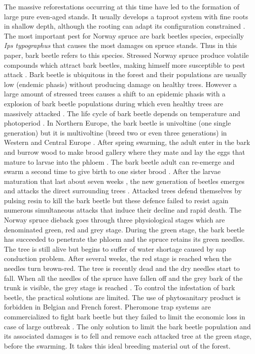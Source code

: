 \documentclass[3p,procedia]{elsarticle}
\begin{document}
The massive reforestations occurring at this time have led to the formation of large pure even-aged stands.
It usually develops a taproot system with fine roots in shallow depth, although the rooting can adapt its configuration constrained \citep{puhe_roots_2003,kostler_1968}.    
The most important pest for Norway spruce are bark beetles species, especially \textit{Ips typographus} that causes the most damages on spruce stands.
Thus in this paper, bark beetle refers to this species.
Stressed Norway spruce produce volatile compounds which attract bark beetles, making himself more susceptible to pest attack \citep{netherer_waterlimiting_2015,netherer_interactions_2021}.
Bark beetle is ubiquitous in the forest and their populations are usually low (endemic phasis) without producing damage on healthy trees. 
However a large amount of stressed trees causes a shift to an epidemic phasis with a explosion of bark beetle populations during which even healthy trees are massively attacked \citep{kautz_individual_2014}.
The life cycle of bark beetle depends on temperature and photoperiod \citep{annila_influence_1969, baier_phenipscomprehensive_2007}.
In Northern Europe, the bark beetle is univoltine (one single generation) but it is multivoltine (breed two or even three generations) in Western and Central Europe \citep{annila_influence_1969}.
After spring swarming, the adult enter in the bark and burrow wood to make brood gallery where they mate and lay the eggs that mature to larvae into the phloem \citep{hlasny_bark_2021}.
The bark beetle adult can re-emerge and swarm a second time to give birth to one sister brood \citep{zolubas_1995}.
After the larvae maturation that last about seven weeks \citep{baier_phenipscomprehensive_2007}, the new generation of beetles emerges and attacks the direct surrounding trees \citep{zolubas_1995}.
Attacked trees defend themselves by pulsing resin to kill the bark beetle but these defence failed to resist again numerous simultaneous attacks that induce their decline and rapid death.
The Norway spruce dieback goes through three physiological stages which are denominated green, red and grey stage.
During the green stage, the bark beetle has succeeded to penetrate the phloem and the spruce retains its green needles. 
The tree is still alive but begins to suffer of water shortage caused by sap conduction problem. 
After several weeks, the red stage is reached when the needles turn brown-red. The tree is recently dead and the dry needles start to fall.
When all the needles of the spruce have fallen off and the grey bark of the trunk is visible, the grey stage is reached \citep{abdullah_european_2018}. 
To control the infestation of bark beetle, the practical solutions are limited. 
The use of phytosanitary product is forbidden in Belgian and French forest.
Pheromone trap systems are commercialized to fight bark beetle but they failed to limit the economic loss in case of large outbreak \citep{kuhn_pheromone_2022}.
The only solution to limit the bark beetle population and its associated damages is to fell and remove each attacked tree at the green stage, before the swarming.
It takes this ideal breeding material out of the forest.
\end{document}
